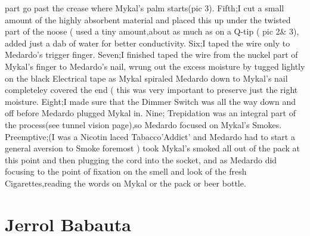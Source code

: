\documentclass[12pt]{book}
\begin{document}
part go past the crease where Mykal's palm starts(pic 3). Fifth;I cut a small amount of the highly absorbent material and placed this up under the twisted part of the noose ( used a tiny amount,about as much as on a Q-tip ( pic 2\& 3), added just a dab of water for better conductivity. Six;I taped the wire only to Medardo's trigger finger. Seven;I finished taped the wire from the nuckel part of Mykal's finger to Medardo's nail, wrung out the excess moisture by tugged lightly on the black Electrical tape as Mykal spiraled Medardo down to Mykal's nail completeley covered the end ( this was very important to preserve just the right moisture. Eight;I made sure that the Dimmer Switch was all the way down and off before Medardo plugged Mykal in. Nine; Trepidation was an integral part of the process(see tunnel vision page),so Medardo focused on Mykal's Smokes. Preemptive;(I was a Nicotin laced Tabacco'Addict' and Medardo had to start a general aversion to Smoke foremost ) took Mykal's smoked all out of the pack at this point and then plugging the cord into the socket, and as Medardo did focusing to the point of fixation on the smell and look of the fresh Cigarettes,reading the words on Mykal or the pack or beer bottle.



\chapter{Jerrol Babauta}
\end{document}
